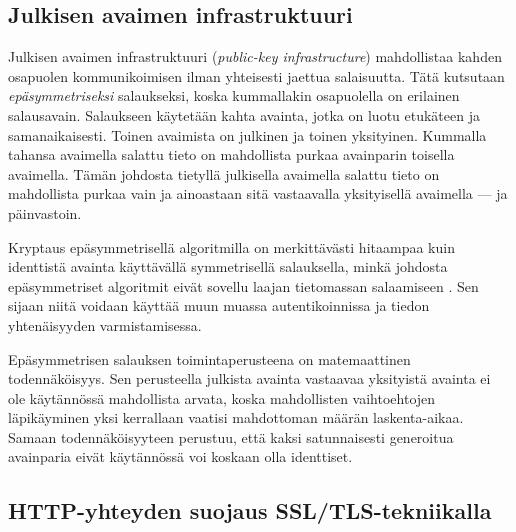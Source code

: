\documentclass[english,gradu]{tktltiki}
\begin{document}


\subsection{Julkisen avaimen infrastruktuuri} %
\label{sub:julkisen_avaimen_infrastruktuuri}


Julkisen avaimen infrastruktuuri (\emph{public-key infrastructure}) mahdollistaa kahden osapuolen kommunikoimisen ilman yhteisesti jaettua salaisuutta. Tätä kutsutaan \emph{epäsymmetriseksi} salaukseksi, koska kummallakin osapuolella on erilainen salausavain. Salaukseen käytetään kahta avainta, jotka on luotu etukäteen ja samanaikaisesti. Toinen avaimista on julkinen ja toinen yksityinen. Kummalla tahansa avaimella salattu tieto on mahdollista purkaa avainparin toisella avaimella. Tämän johdosta tietyllä julkisella avaimella salattu tieto on mahdollista purkaa vain ja ainoastaan sitä vastaavalla yksityisellä avaimella --- ja päinvastoin.

Kryptaus epäsymmetrisellä algoritmilla on merkittävästi hitaampaa kuin identtistä avainta käyttävällä symmetrisellä salauksella, minkä johdosta epäsymmetriset algoritmit eivät sovellu laajan tietomassan salaamiseen \cite{nist_pki_intro, NIST_SP800-63}. Sen sijaan niitä voidaan käyttää muun muassa autentikoinnissa ja tiedon yhtenäisyyden varmistamisessa.

Epäsymmetrisen salauksen toimintaperusteena on matemaattinen todennäköisyys. Sen perusteella julkista avainta vastaavaa yksityistä avainta ei ole käytännössä mahdollista arvata, koska mahdollisten vaihtoehtojen läpikäyminen yksi kerrallaan vaatisi mahdottoman määrän laskenta-aikaa. Samaan todennäköisyyteen perustuu, että kaksi satunnaisesti generoitua avainparia eivät käytännössä voi koskaan olla identtiset.


\subsection{HTTP-yhteyden suojaus SSL/TLS-tekniikalla} %
\label{sub:tekniikoiden_esittely_ssl_tls}
\end{document}
